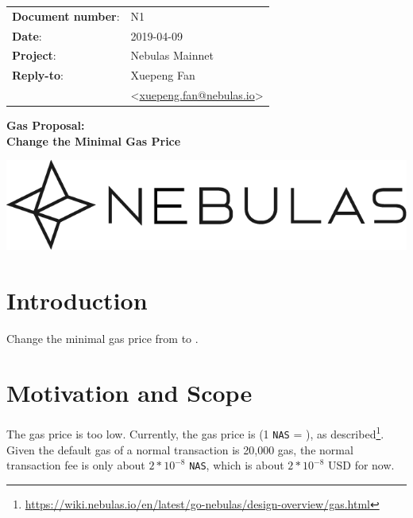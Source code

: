 \documentclass[11pt]{article}
\begin{document}
\begin{titlepage}
    \begin{center}
        \vspace*{1cm}

\begin{flushright}
  \begin{tabular}{ll}
  \textbf{Document number}:& N1 \\
  \textbf{Date}:       & 2019-04-09 \\
  \textbf{Project}:    & Nebulas Mainnet \\
  \textbf{Reply-to}:   & {Xuepeng Fan}\\
              &
              \textless\href{mailto:xuepeng.fan@nebulas.io}{xuepeng.fan@nebulas.io}\textgreater
  \end{tabular}
\end{flushright}

\vspace{2cm}
        \Huge

        \textbf{Gas Proposal: \\Change the Minimal Gas Price}

        \vspace{0.5cm}

        \vfill
        \vspace{0.5cm}
        \includegraphics[scale=0.3]{Nebulas.png}
    \end{center}
\end{titlepage}

\section{Introduction}
Change the minimal gas price from   to  .


\section{Motivation and Scope}
The gas price is too low. Currently, the gas price is  (1 \texttt{NAS} = ),
as described\footnote{\url{https://wiki.nebulas.io/en/latest/go-nebulas/design-overview/gas.html}}.
Given the default gas of a normal transaction is 20,000 gas, the normal transaction fee is only about $2*10^{-8}$ \texttt{NAS}, which is about $2*10^{-8}$ USD for now.
\end{document}
